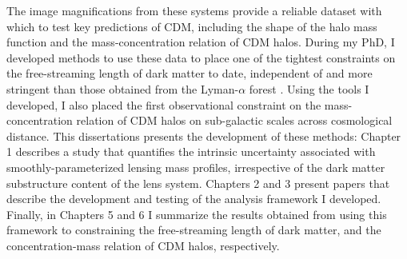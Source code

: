 The image magnifications from these systems provide a reliable dataset with which to test key predictions of CDM, including the shape of the halo mass function and the mass-concentration relation of CDM halos. During my PhD, I developed methods to use these data to place one of the tightest constraints on the free-streaming length of dark matter to date, independent of and more stringent than those obtained from the Lyman-$\alpha$ forest \cite{Viel13}. Using the tools I developed, I also placed the first observational constraint on the mass-concentration relation of CDM halos on sub-galactic scales across cosmological distance. This dissertations presents the development of these methods: Chapter 1 describes a study that quantifies the intrinsic uncertainty associated with smoothly-parameterized lensing mass profiles, irrespective of the dark matter substructure content of the lens system. Chapters 2 and 3 present papers that describe the development and testing of the analysis framework I developed. Finally, in Chapters 5 and 6 I summarize the results obtained from using this framework to constraining the free-streaming length of dark matter, and the concentration-mass relation of CDM halos, respectively. 




